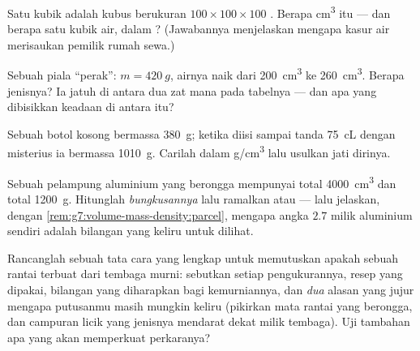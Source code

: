 \begin{exercise}[$\star\star$]\label{exo:g7:volume-mass-density:8}
Satu  kubik adalah kubus berukuran $100 \times 100 \times 100$
. Berapa \unit{cm^3} itu --- dan berapa  satu 
kubik air, dalam ? (Jawabannya menjelaskan mengapa kasur air
merisaukan pemilik rumah sewa.)
\end{exercise}

\begin{exercise}[$\star\star$]\label{exo:g7:volume-mass-density:9}
Sebuah piala ``perak'': $m = \qty{420}{g}$, airnya naik dari
\qty{200}{cm^3} ke \qty{260}{cm^3}. Berapa  jenisnya? Ia jatuh di
antara dua zat mana pada tabelnya --- dan apa yang dibisikkan keadaan
di antara itu?
\end{exercise}

\begin{exercise}[$\star\star$]\label{exo:g7:volume-mass-density:10}
Sebuah botol kosong bermassa \qty{380}{g}; ketika diisi sampai tanda
\qty{75}{cL} dengan  misterius ia bermassa \qty{1010}{g}.
Carilah   dalam \unit{g/cm^3} lalu usulkan
jati dirinya.
\end{exercise}

\begin{exercise}[$\star\star$]\label{exo:g7:volume-mass-density:11}
Sebuah pelampung aluminium yang berongga mempunyai  total
\qty{4000}{cm^3} dan  total \qty{1200}{g}. Hitunglah 
\emph{bungkusannya} lalu ramalkan  atau  --- lalu
jelaskan, dengan \cref{rem:g7:volume-mass-density:parcel}, mengapa
angka $2.7$ milik aluminium sendiri adalah bilangan yang keliru untuk
dilihat.
\end{exercise}

\begin{exercise}[$\star\star\star$]\label{exo:g7:volume-mass-density:12}
Rancanglah sebuah tata cara yang lengkap untuk memutuskan apakah
sebuah rantai terbuat dari tembaga murni: sebutkan setiap
pengukurannya, resep yang dipakai, bilangan yang diharapkan bagi
kemurniannya, dan \emph{dua} alasan yang jujur mengapa putusanmu masih
mungkin keliru (pikirkan mata rantai yang berongga, dan campuran licik
yang  jenisnya mendarat dekat milik tembaga). Uji tambahan apa
yang akan memperkuat perkaranya?
\end{exercise}

